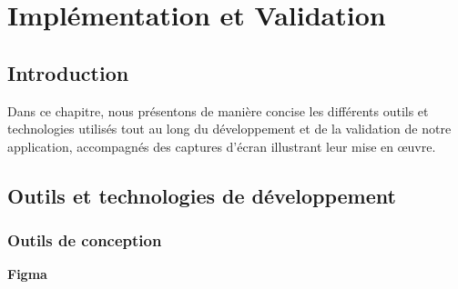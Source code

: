 




\chapter{Implémentation et Validation}
\pagestyle{chapterstyle}


\newpage
\vspace{1cm}

\section{Introduction}
Dans ce chapitre, nous présentons de manière concise les différents 
outils et technologies utilisés tout au long du développement et de la validation de notre 
application, accompagnés des captures d'écran illustrant leur mise en œuvre.



\section{Outils et technologies de développement}
\subsection{Outils de conception}

\large 
\textbf{Figma}

